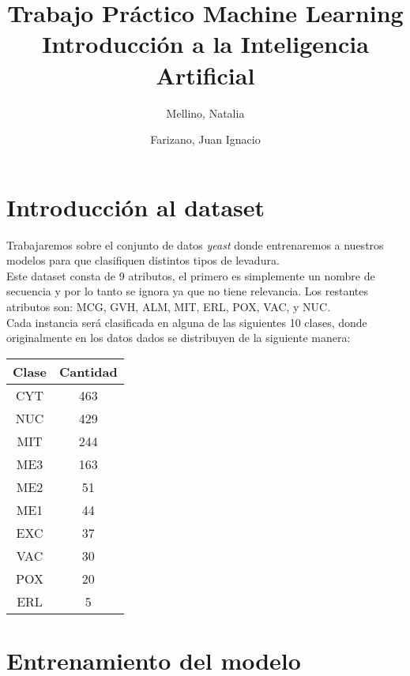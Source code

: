 \documentclass[11pt]{article}
\title{
    Trabajo Práctico Machine Learning \\
    \large Introducción a la Inteligencia Artificial}
\author{Mellino, Natalia \and Farizano, Juan Ignacio}
\date{}
\begin{document}
\maketitle

\section*{Introducción al dataset}

Trabajaremos sobre el conjunto de datos \emph{yeast} donde entrenaremos
a nuestros modelos para que clasifiquen distintos tipos de levadura. \\

Este dataset consta de 9 atributos, el primero es simplemente un nombre de
secuencia y por lo tanto se ignora ya que no tiene relevancia.
Los restantes atributos son: MCG, GVH, ALM, MIT, ERL, POX, VAC, y NUC. \\

Cada instancia será clasificada en alguna de las siguientes 10 clases, donde 
originalmente en los datos dados se distribuyen de la siguiente manera:  

\begin{table}[h!]
  \begin{center}
    \begin{tabular}{|c|c|}
      \hline
      Clase     & Cantidad     \\ \hline
      CYT       & 463          \\ \hline
      NUC       & 429          \\ \hline
      MIT       & 244          \\ \hline
      ME3       & 163          \\ \hline
      ME2       & 51           \\ \hline
      ME1       & 44           \\ \hline
      EXC       & 37           \\ \hline
      VAC       & 30           \\ \hline
      POX       & 20           \\ \hline
      ERL       & 5            \\ \hline
    \end{tabular}
  \end{center}
\end{table}

\section*{Entrenamiento del modelo}
\end{document}
